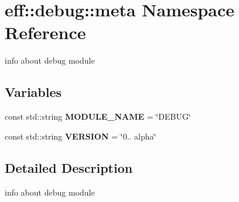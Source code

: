 \hypertarget{namespaceeff_1_1debug_1_1meta}{}\section{eff\+:\+:debug\+:\+:meta Namespace Reference}
\label{namespaceeff_1_1debug_1_1meta}


info about debug module  


\subsection*{Variables}
\begin{DoxyCompactItemize}
\item 
\mbox{\label{namespaceeff_1_1debug_1_1meta_a32673dd59e1132ab151af5d223f9b0bf}} 
const std\+::string {\bfseries M\+O\+D\+U\+L\+E\+\_\+\+N\+A\+ME} = \char`\"{}D\+E\+B\+UG\char`\"{}
\item 
\mbox{\label{namespaceeff_1_1debug_1_1meta_a8ac77351ca371ab8d300bb53953d38e5}} 
const std\+::string {\bfseries V\+E\+R\+S\+I\+ON} = \char`\"{}0.. alpha\char`\"{}
\end{DoxyCompactItemize}


\subsection{Detailed Description}
info about debug module 